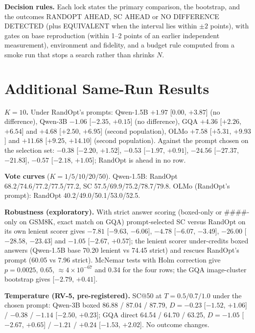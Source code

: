 \documentclass{article}
\begin{document}
\textbf{Decision rules.} Each lock states the primary comparison, the bootstrap, and the outcomes RANDOPT AHEAD, SC
AHEAD or NO DIFFERENCE DETECTED (plus EQUIVALENT when the interval lies within $\pm 2$ points), with gates on base
reproduction (within 1--2 points of an earlier independent measurement), environment and fidelity, and a budget rule
computed from a smoke run that stops a search rather than shrinks $N$.

\section{Additional Same-Run Results}\label{app:samerun}
\textbf{$K{=}10$.} Under RandOpt's prompts: Qwen-1.5B $+1.97$ [$0.00$, $+3.87$] (no difference), Qwen-3B $-1.06$
[$-2.35$, $+0.15$] (no difference), GQA $+4.36$ [$+2.26$, $+6.54$] and $+4.68$ [$+2.50$, $+6.95$] (second population),
OLMo $+7.58$ [$+5.31$, $+9.93$] and $+11.68$ [$+9.25$, $+14.10$] (second population). Against the prompt chosen on the
selection set: $-0.38$ [$-2.20$, $+1.52$], $-0.53$ [$-1.97$, $+0.91$], $-24.56$ [$-27.37$, $-21.83$], $-0.57$ [$-2.18$,
$+1.05$]; RandOpt is ahead in no row.

\textbf{Vote curves} ($K = 1/5/10/20/50$). Qwen-1.5B: RandOpt 68.2/74.6/77.2/77.5/77.2, SC 57.5/69.9/75.2/78.7/79.8.
OLMo (RandOpt's prompt): RandOpt 40.2/49.0/50.1/53.0/52.5.

\textbf{Robustness (exploratory).} With strict answer scoring (boxed-only or \#\#\#\#-only on GSM8K, exact match on
GQA) prompt-selected SC versus RandOpt on its own lenient scorer gives $-7.81$ [$-9.63$, $-6.06$], $-4.78$ [$-6.07$,
$-3.49$], $-26.00$ [$-28.58$, $-23.43$] and $-1.05$ [$-2.67$, $+0.57$]; the lenient scorer under-credits boxed answers
(Qwen-1.5B base 70.20 lenient vs 74.45 strict) and rescues RandOpt's prompt (60.05 vs 7.96 strict). McNemar tests with
Holm correction give $p = 0.0025$, 0.65, $\approx 4\times10^{-67}$ and 0.34 for the four rows; the GQA image-cluster
bootstrap gives [$-2.79$, $+0.41$].

\textbf{Temperature (RV-5, pre-registered).} SC@50 at $T = 0.5 / 0.7 / 1.0$ under the chosen prompt: Qwen-3B boxed
86.88 / 87.04 / 87.79, $D = -0.23$ [$-1.52$, $+1.06$] / $-0.38$ / $-1.14$ [$-2.50$, $+0.23$]; GQA direct 64.54 / 64.70 /
63.25, $D = -1.05$ [$-2.67$, $+0.65$] / $-1.21$ / $+0.24$ [$-1.53$, $+2.02$]. No outcome changes.
\end{document}

